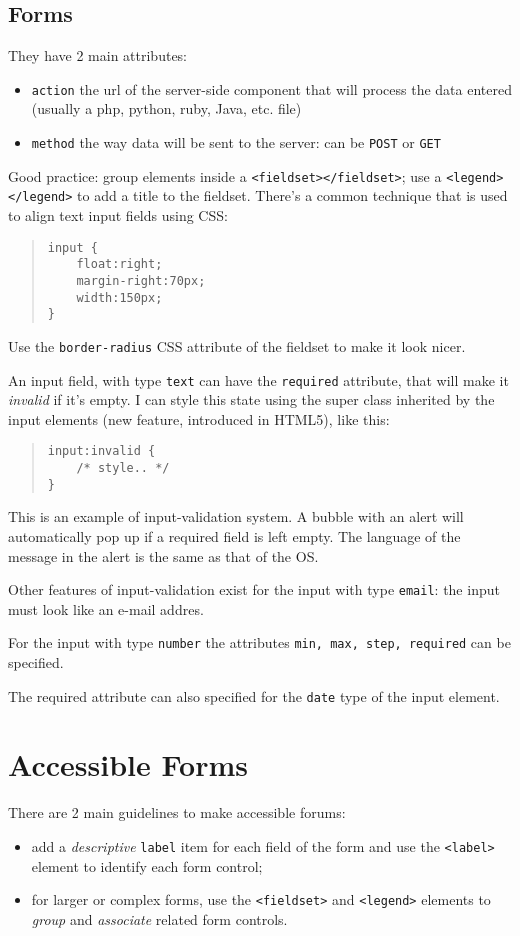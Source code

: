 \documentclass[a4paper,11pt]{book}
\begin{document}
\subsection{Forms}
They have 2 main attributes:
\begin{itemize}
\item \texttt{action} the url of the server-side component that will process the data entered
	(usually a php, python, ruby, Java, etc. file)
\item \texttt{method} the way data will be sent to the server: can be \texttt{POST} or \texttt{GET}
\end{itemize}
Good practice: group elements inside a \texttt{<fieldset></fieldset>}; use a
\texttt{<legend></legend>} to add a title to the fieldset.
There's a common technique that is used to align text input fields using CSS:
\begin{verse}
\begin{verbatim}
input {
	float:right;
	margin-right:70px;
	width:150px;
}
\end{verbatim}
\end{verse}

Use the \texttt{border-radius} CSS attribute of the fieldset to make it look nicer.

An input field, with type \texttt{text} can have the \texttt{required} attribute,
that will make it \textit{invalid} if it's empty.
I can style this state using the super class inherited by the input elements
(new feature, introduced in HTML5), like this:
\begin{verse}
\begin{verbatim}
input:invalid {
	/* style.. */
}
\end{verbatim}
\end{verse}
This is an example of input-validation system.
A bubble with an alert will automatically pop up if a required field is left empty. The
language of the message in the alert is the same as that of the OS.

Other features of input-validation exist for the input with type \texttt{email}: the
input must look like an e-mail addres.

For the input with type \texttt{number} the attributes \texttt{min, max, step, required}
can be specified.

The required attribute can also specified for the \texttt{date} type of the input element.

\section{Accessible Forms}
There are 2 main guidelines to make accessible forums:
\begin{itemize}
\item add a \textit{descriptive} \texttt{label} item for each field of the form and use the
 \texttt{<label>} element to identify each form control;
\item for larger or complex forms, use the \texttt{<fieldset>} and \texttt{<legend>} elements
 to \textit{group} and \textit{associate} related form controls.
\end{itemize}
\end{document}

